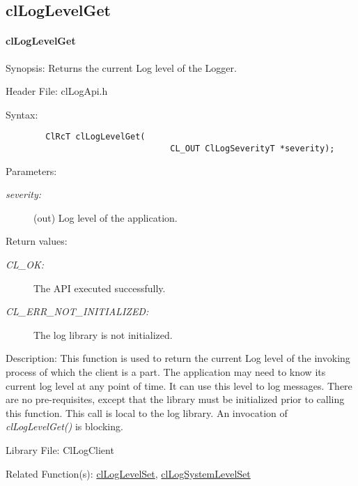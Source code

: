\subsection{clLogLevelGet}
\hypertarget{pagelog104}{}\paragraph{cl\-Log\-Level\-Get}\label{pagelog104}
\begin{Desc}
\item[Synopsis:]Returns the current Log level of the Logger.\end{Desc}
\begin{Desc}
\item[Header File:]clLogApi.h\end{Desc}
\begin{Desc}
\item[Syntax:]

\footnotesize\begin{verbatim}        ClRcT clLogLevelGet(
                                 CL_OUT ClLogSeverityT *severity);
\end{verbatim}
\normalsize
\end{Desc}
\begin{Desc}
\item[Parameters:]
\begin{description}
\item[{\em severity:}](out) Log level of the application.\end{description}
\end{Desc}
\begin{Desc}
\item[Return values:]
\begin{description}
\item[{\em CL\_\-OK:}]The API executed successfully. \item[{\em CL\_\-ERR\_\-NOT\_\-INITIALIZED:}]The log library is not initialized.\end{description}
\end{Desc}
\begin{Desc}
\item[Description:]This function is used to return the current Log level of the invoking process of which the client is a part. The application may need 
to know its current log level at any point of time. It can use this level to log messages. There are no pre-requisites, except that the library must be 
initialized prior to calling this function. This call is local to the log library. An invocation of 
\textit{clLogLevelGet()} is blocking.\end{Desc}
\begin{Desc}
\item[Library File:]Cl\-Log\-Client\end{Desc}
\begin{Desc}
\item[Related Function(s):]\hyperlink{pagelog103}{cl\-Log\-Level\-Set}, \hyperlink{pagelog108}{cl\-Log\-System\-Level\-Set} \end{Desc}
\newpage

